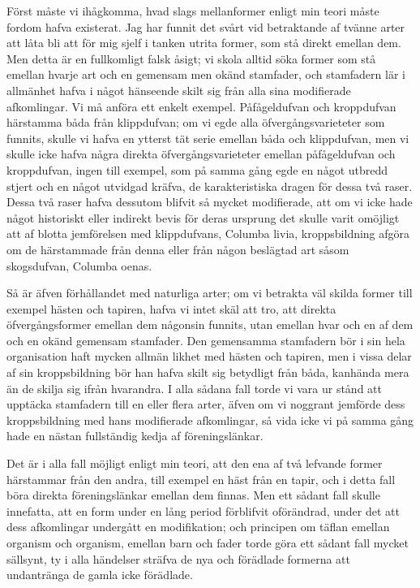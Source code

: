 Först måste vi ihågkomma, hvad slags mellanformer enligt min teori måste fordom hafva existerat. Jag har funnit det svårt vid betraktande af tvänne arter att låta bli att för mig sjelf i tanken utrita former, som stå direkt emellan dem. Men detta är en fullkomligt falsk åsigt; vi skola alltid söka former som stå emellan hvarje art och en gemensam men okänd stamfader, och stamfadern lär i allmänhet hafva i något hänseende skilt sig från alla sina modifierade afkomlingar. Vi må anföra ett enkelt exempel. Påfågeldufvan och kroppdufvan härstamma båda från klippdufvan; om vi egde alla öfvergångsvarieteter som funnits, skulle vi hafva en ytterst tät serie emellan båda och klippdufvan, men vi skulle icke hafva några direkta öfvergångsvarieteter emellan påfågeldufvan och kroppdufvan, ingen till exempel, som på samma gång egde en något utbredd stjert och en något utvidgad kräfva, de karakteristiska dragen för dessa två raser. Dessa två raser hafva dessutom blifvit så mycket modifierade, att om vi icke hade något historiskt eller indirekt bevis för deras ursprung det skulle varit omöjligt att af blotta jemförelsen med klippdufvans, Columba livia, kroppsbildning afgöra om de härstammade från denna eller från någon beslägtad art såsom skogsdufvan, Columba oenas.

Så är äfven förhållandet med naturliga arter; om vi betrakta väl skilda former till exempel hästen och tapiren, hafva vi intet skäl att tro, att direkta öfvergångsformer emellan dem någonsin funnits, utan emellan hvar och en af dem och en okänd gemensam stamfader. Den gemensamma stamfadern bör i sin hela organisation haft mycken allmän likhet med hästen och tapiren, men i vissa delar af sin kroppsbildning bör han hafva skilt sig betydligt från båda, kanhända mera än de skilja sig ifrån hvarandra. I alla sådana fall torde vi vara ur stånd att upptäcka stamfadern till en eller flera arter, äfven om vi noggrant jemförde dess kroppsbildning med hans modifierade afkomlingar, så vida icke vi på samma gång hade en nästan fullständig kedja af föreningslänkar.

Det är i alla fall möjligt enligt min teori, att den ena af två lefvande former härstammar från den andra, till exempel en häst från en tapir, och i detta fall böra direkta föreningslänkar emellan dem finnas. Men ett sådant fall skulle innefatta, att en form under en lång period förblifvit oförändrad, under det att dess afkomlingar undergått en modifikation; och principen om täflan emellan organism och organism, emellan barn och fader torde göra ett sådant fall mycket sällsynt, ty i alla händelser sträfva de nya och förädlade formerna att undantränga de gamla icke förädlade.

